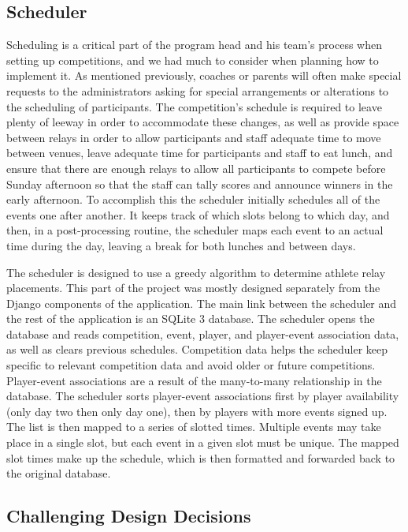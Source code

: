 \documentclass[sigconf]{acmart}
\begin{document}
\subsection{Scheduler}%

Scheduling is a critical part of the program head and his team's process when setting up competitions, and we had much to consider when planning how to implement it. As mentioned previously, coaches or parents will often make special requests to the administrators asking for special arrangements or alterations to the scheduling of participants. The competition's schedule is required to leave plenty of leeway in order to accommodate these changes, as well as provide space between relays in order to allow participants and staff adequate time to move between venues, leave adequate time for participants and staff to eat lunch, and ensure that there are enough relays to allow all participants to compete before Sunday afternoon so that the staff can tally scores and announce winners in the early afternoon. To accomplish this the scheduler initially schedules all of the events one after another. It keeps track of which slots belong to which day, and then, in a post-processing routine, the scheduler maps each event to an actual time during the day, leaving a break for both lunches and between days. 

The scheduler is designed to use a greedy algorithm to determine athlete relay placements. This part of the project was mostly designed separately from the Django components of the application. The main link between the scheduler and the rest of the application is an SQLite 3 database. The scheduler opens the database and reads competition, event, player, and player-event association data, as well as clears previous schedules. Competition data helps the scheduler keep specific to relevant competition data and avoid older or future competitions. Player-event associations are a result of the many-to-many relationship in the database. The scheduler sorts player-event associations first by player availability (only day two then only day one), then by players with more events signed up. The list is then mapped to a series of slotted times. Multiple events may take place in a single slot, but each event in a given slot must be unique. The mapped slot times make up the schedule, which is then formatted and forwarded back to the original database.

\subsection{Challenging Design Decisions}
\end{document}
